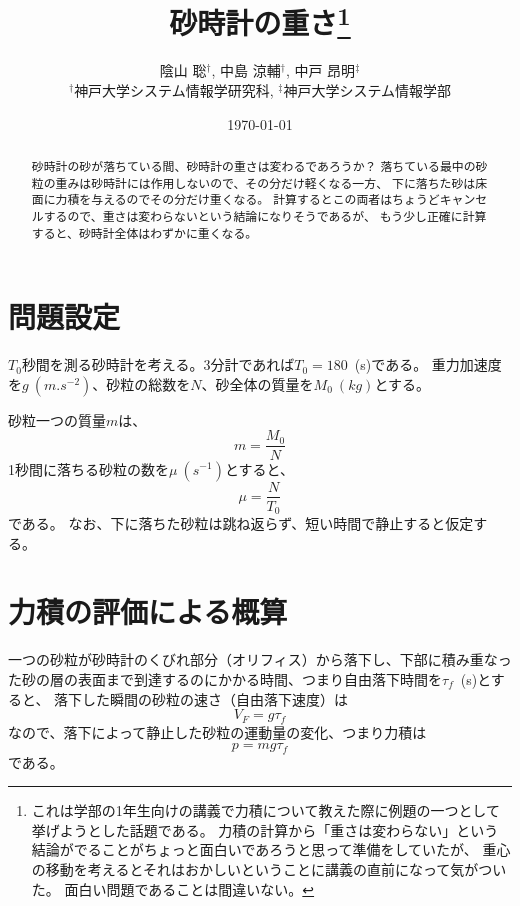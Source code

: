 \documentclass[]{article}
\title{砂時計の重さ\footnote{%
これは学部の1年生向けの講義で力積について教えた際に例題の一つとして挙げようとした話題である。
力積の計算から「重さは変わらない」という結論がでることがちょっと面白いであろうと思って準備をしていたが、
重心の移動を考えるとそれはおかしいということに講義の直前になって気がついた。
面白い問題であることは間違いない。
}}
\author{陰山 聡$^\dagger$, 中島 涼輔$^\dagger$, 中戸 昂明$^\ddagger$\\[0.5em] $^\dagger$神戸大学システム情報学研究科, $^\ddagger$神戸大学システム情報学部}
\date{\today}
\begin{document}
\maketitle


\begin{abstract}
砂時計の砂が落ちている間、砂時計の重さは変わるであろうか？
落ちている最中の砂粒の重みは砂時計には作用しないので、その分だけ軽くなる一方、
下に落ちた砂は床面に力積を与えるのでその分だけ重くなる。
計算するとこの両者はちょうどキャンセルするので、重さは変わらないという結論になりそうであるが、
もう少し正確に計算すると、砂時計全体はわずかに重くなる。
\end{abstract}


\section{問題設定}
$T_0$秒間を測る砂時計を考える。3分計であれば$T_0=180$~(\si{s})である。
重力加速度を$g~(\si{m.s^{-2}})$、砂粒の総数を$N$、砂全体の質量を$M_0~(\si{kg})$とする。


砂粒一つの質量$m$は、
\begin{equation} \label{250517100232} 
   m = \frac{M_0}{N} 
\end{equation}
1秒間に落ちる砂粒の数を$\mu~(\si{s^{-1}})$とすると、
\begin{equation} \label{250515082817} 
   \mu = \frac{N}{T_0}
\end{equation}
である。
なお、下に落ちた砂粒は跳ね返らず、短い時間で静止すると仮定する。


\section{力積の評価による概算} \label{250517204115}

一つの砂粒が砂時計のくびれ部分（オリフィス）から落下し、下部に積み重なった砂の層の表面まで到達するのにかかる時間、つまり自由落下時間を$\tau_f$~(\si{s})とすると、
落下した瞬間の砂粒の速さ（自由落下速度）は
\begin{equation} \label{250512190520} 
   V_F = g\tau_f
\end{equation}
なので、落下によって静止した砂粒の運動量の変化、つまり力積は
\begin{equation} \label{250512190655} 
   p = mg\tau_f
\end{equation}
である。
\end{document}
